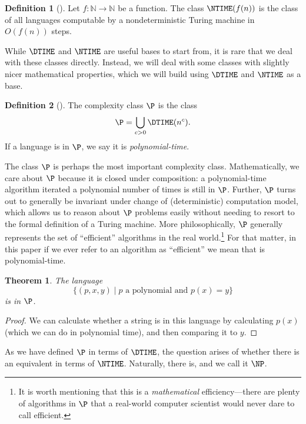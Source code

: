 \documentclass[english,12pt]{reedthesis}
\theoremstyle{plain}
\newtheorem{thm}{Theorem}[section]
\theoremstyle{definition}
\newtheorem{defn}[defn]{Definition}
\theoremstyle{remark}
\begin{document}
\begin{defn}[{\cite[Def.\ 2.5]{AB09}}]\label{def:ntime}
  Let $f\colon \mathbb{N} \rightarrow \mathbb{N}$ be a function. The class $\NTIME(f(n))$ is the class of
  all languages computable by a nondeterministic Turing machine in $O(f(n))$
  steps.
\end{defn}

While $\DTIME$ and $\NTIME$ are useful bases to start from, it is rare that we
deal with these classes directly. Instead, we will deal with some classes with
slightly nicer mathematical properties, which we will build using $\DTIME$ and
$\NTIME$ as a base.

\begin{defn}[{\cite[Def.\ 1.20]{AB09}}]%
  \label{def:p}
  The complexity class $\P$ is the class
  \[
    \P = \bigcup_{c > 0}\DTIME(n^{c}).
  \]
  If a language is in $\P$, we say it is \emph{polynomial-time}.
\end{defn}

The class $\P$ is perhaps the most important complexity class. Mathematically,
we care about $\P$ because it is closed under composition: a polynomial-time
algorithm iterated a polynomial number of times is still in $\P$. Further, $\P$
turns out to generally be invariant under change of (deterministic) computation
model, which allows us to reason about $\P$ problems easily without needing to
resort to the formal definition of a Turing machine. More philosophically, $\P$
generally represents the set of ``efficient'' algorithms in the real
world.\footnote{It is worth mentioning that this is a \emph{mathematical}
  efficiency---there are plenty of algorithms in $\P$ that a real-world computer
  scientist would never dare to call efficient.} For that matter, in this paper
if we ever refer to an algorithm as ``efficient'' we mean that is
polynomial-time.

\begin{thm}\label{thm:polynomial-is-p}
  The language
  \[
    \{(p, x, y) \mid p \text{ a polynomial and } p(x) = y\}
  \]
  is in $\P$.
\end{thm}

\begin{proof}
  We can calculate whether a string is in this language by calculating $p(x)$
  (which we can do in polynomial time), and then comparing it to $y$.
\end{proof}

As we have defined $\P$ in terms of $\DTIME$, the question arises of whether
there is an equivalent in terms of $\NTIME$. Naturally, there is, and we call it
$\NP$.
\end{document}
